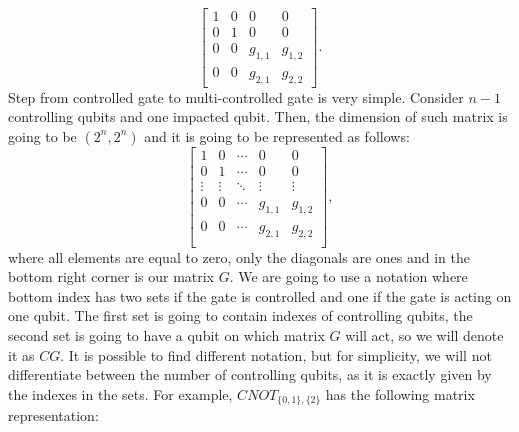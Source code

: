 \begin{equation}
    \begin{bmatrix}
        1 & 0 & 0 & 0 \\ 
        0 & 1 & 0 & 0 \\
        0 & 0 & g_{1,1} & g_{1,2} \\
        0 & 0 & g_{2,1} & g_{2,2} 
    \end{bmatrix}.
\end{equation}
Step from controlled gate to multi-controlled gate is very simple. Consider $n-1$ controlling qubits and one impacted qubit. Then, the dimension of such matrix is going to be $(2^n ,2^n)$ and it is going to be represented as follows:
\begin{equation}
    \begin{bmatrix}
        1 & 0 & \cdots & 0 & 0 \\ 
        0 & 1 & \cdots & 0 & 0 \\
        \vdots & \vdots & \ddots & \vdots & \vdots \\
        0 & 0 &  \cdots & g_{1,1} & g_{1,2} \\
        0 & 0 &  \cdots & g_{2,1} & g_{2,2} \\

    \end{bmatrix},
\end{equation}
where all elements are equal to zero, only the diagonals are ones and in the bottom right corner is our matrix $G$.  We are going to use a notation where bottom index has two sets if the gate is controlled and one if the gate is acting on one qubit. The first set is going to
contain indexes of controlling qubits, the second set is going to have a qubit on which matrix $G$ will act, so we will denote it as $CG$. It is possible to find different notation, but for simplicity, we will not differentiate between the number of controlling qubits, as it is exactly given by the indexes in the sets. For example, $CNOT_{\{0,1\},\{2\} }$ has the following matrix representation:

